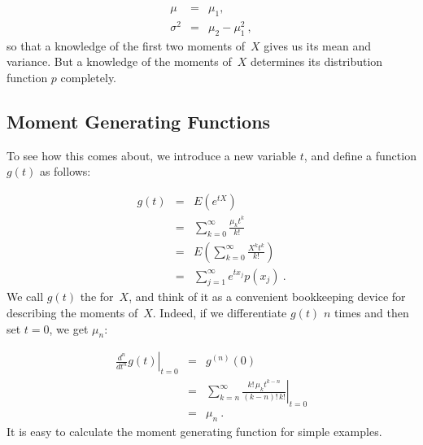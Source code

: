 \begin{eqnarray*}
     \mu &=& \mu_1, \\
\sigma^2 &=& \mu_2 - \mu_1^2\ ,
\end{eqnarray*}
so that a knowledge of the first two moments of~$X$ gives us its mean and
variance.  But a knowledge of  the moments of~$X$ determines its
distribution function $p$ completely.

\subsection*{Moment Generating Functions}
To see how this comes about, we introduce a new variable $t$, and define a
function $g(t)$ as follows:

\begin{eqnarray*}
g(t) &=& E(e^{tX}) \\
     &=& \sum_{k = 0}^\infty \frac {\mu_k t^k}{k!} \\
     &=& E\left(\sum_{k = 0}^\infty \frac {X^k t^k}{k!} \right) \\
     &=& \sum_{j = 1}^\infty e^{tx_j} p(x_j)\ .
\end{eqnarray*}
We call $g(t)$ the  for~$X$, and think of it as a convenient
bookkeeping device for describing the moments of~$X$.  Indeed, if we differentiate $g(t)$ $n$
times and then set
$t = 0$, we get $\mu_n$:

\begin{eqnarray*}
\left. \frac {d^n}{dt^n} g(t) \right|_{t = 0} &=& g^{(n)}(0) \\
     &=& \left. \sum_{k = n}^\infty \frac {k!\, \mu_k t^{k - n}} {(k - n)!\, k!}
\right|_{t = 0} \\
     &=& \mu_n\ .
\end{eqnarray*}
It is easy to calculate the moment generating function for simple examples.

